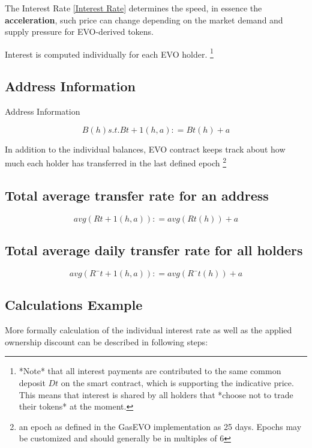 The Interest Rate \ref{Interest Rate} determines the speed, in essence the \textbf{acceleration}, such price can change depending on the market demand and supply pressure for EVO-derived tokens.

Interest is computed individually for each EVO holder. \footnote{
*Note* that all interest payments are contributed to the same common deposit $Dt$ on the smart contract, which is supporting the indicative price. This means that interest is shared by all holders that *choose not to trade their tokens* at the moment.}




\label{sec:Calculations}
\subsection{Address Information}
Address Information


\begin{equation}
B(h) s.t. Bt + 1(h, a): = Bt(h) + a 
\end{equation}


In addition to the individual balances, EVO contract keeps track about how much each holder has transferred in the last defined epoch \footnote{an epoch as defined in the GasEVO implementation as 25 days. Epochs may be customized and should generally be in multiples of 6}

\label{sec:Calculations}
\subsection{Total average transfer rate for an address}

\begin{equation}
avg(Rt + 1(h, a)): = avg(Rt(h)) + a
\end{equation}


\label{sec:Calculations}
\subsection{Total average daily transfer rate for all holders}
\begin{equation}
avg(R¯ t + 1(h, a)): = avg(R¯t(h)) + a
\end{equation}

\subsection{Calculations Example}
More formally calculation of the individual interest rate as well as the applied ownership discount can be described in following steps:

